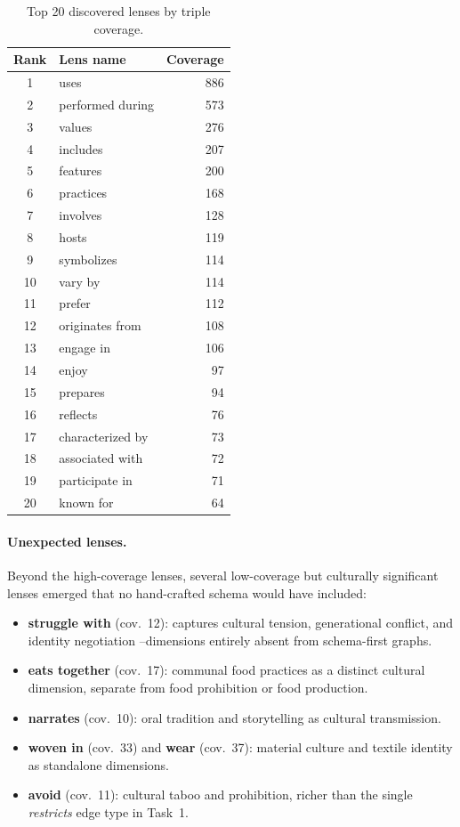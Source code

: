 \documentclass[11pt]{article}
\begin{document}
\begin{table}[h]
\centering
\small
\begin{tabular}{clr}
\toprule
\textbf{Rank} & \textbf{Lens name} & \textbf{Coverage} \\
\midrule
1  & uses              & 886 \\
2  & performed during  & 573 \\
3  & values            & 276 \\
4  & includes          & 207 \\
5  & features          & 200 \\
6  & practices         & 168 \\
7  & involves          & 128 \\
8  & hosts             & 119 \\
9  & symbolizes        & 114 \\
10 & vary by           & 114 \\
11 & prefer            & 112 \\
12 & originates from   & 108 \\
13 & engage in         & 106 \\
14 & enjoy             & 97  \\
15 & prepares          & 94  \\
16 & reflects          & 76  \\
17 & characterized by  & 73  \\
18 & associated with   & 72  \\
19 & participate in    & 71  \\
20 & known for         & 64  \\
\bottomrule
\end{tabular}
\caption{Top 20 discovered lenses by triple coverage.}
\label{tab:lenses}
\end{table}

\paragraph{Unexpected lenses.}
Beyond the high-coverage lenses, several low-coverage but culturally
significant lenses emerged that no hand-crafted schema would have included:

\begin{itemize}
  \item \textbf{struggle with} (cov.\ 12): captures cultural tension,
  generational conflict, and identity negotiation --dimensions entirely
  absent from schema-first graphs.
  \item \textbf{eats together} (cov.\ 17): communal food practices as a
  distinct cultural dimension, separate from food prohibition or
  food production.
  \item \textbf{narrates} (cov.\ 10): oral tradition and storytelling as
  cultural transmission.
  \item \textbf{woven in} (cov.\ 33) and \textbf{wear} (cov.\ 37):
  material culture and textile identity as standalone dimensions.
  \item \textbf{avoid} (cov.\ 11): cultural taboo and prohibition, richer
  than the single \emph{restricts} edge type in Task~1.
\end{itemize}
\end{document}
